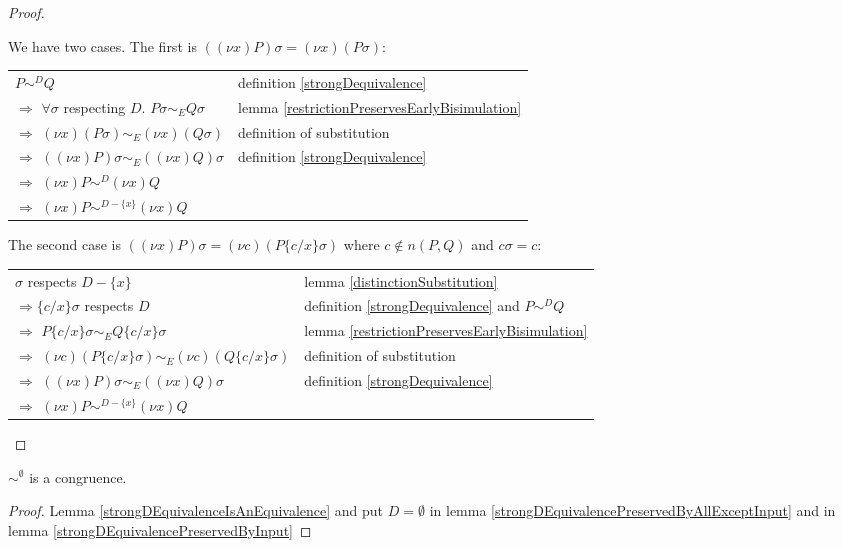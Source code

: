 \begin{lemma}
\begin{proof}
\begin{description}
	We have two cases. The first is $((\nu x) P)\sigma=(\nu x)(P\sigma)$:
	\begin{center}
	  \begin{tabular}{ll}
	      $P \sim^{D} Q$
	    &
	      definition \ref{strongDequivalence}
	  \\
	      $\Rightarrow$ $\forall \sigma$ respecting $D.$ $P\sigma \sim_{E} Q\sigma$
	    &
	      lemma \ref{restrictionPreservesEarlyBisimulation}
	  \\
	      $\Rightarrow$ $(\nu x)(P\sigma) \sim_{E} (\nu x)(Q\sigma)$
	    &
	      definition of substitution 
	  \\
	      $\Rightarrow$ $((\nu x)P)\sigma \sim_{E} ((\nu x)Q)\sigma$
	    &
	      definition \ref{strongDequivalence}
	  \\
	      $\Rightarrow$ $(\nu x)P \sim^{D} (\nu x)Q$
	    &
 	  \\
 	      $\Rightarrow$ $(\nu x)P \sim^{D-\{x\}} (\nu x)Q$
 	    &
	  \end{tabular}
	\end{center}		
	The second case is $((\nu x) P)\sigma=(\nu c)(P\{c/x\}\sigma)$ where $c\notin n(P,Q)$ and $c \sigma = c$:
	\begin{center}
	  \begin{tabular}{ll}
 	      $\sigma$ respects $D-\{x\}$
 	    &
 	      lemma \ref{distinctionSubstitution}
 	  \\
 	      $\Rightarrow \{c/x\}\sigma$ respects $D$
 	    &
 	      definition \ref{strongDequivalence} and $P \sim^{D} Q$
 	  \\
 	      $\Rightarrow$ $P\{c/x\}\sigma \sim_{E} Q\{c/x\}\sigma$
 	    &
 	      lemma \ref{restrictionPreservesEarlyBisimulation}
 	  \\
 	      $\Rightarrow$ $(\nu c)(P\{c/x\}\sigma) \sim_{E} (\nu c)(Q\{c/x\}\sigma)$
 	    &
 	      definition of substitution 
 	  \\
 	      $\Rightarrow$ $((\nu x)P)\sigma \sim_{E} ((\nu x)Q)\sigma$
 	    &
 	      definition \ref{strongDequivalence}
 	  \\
 	      $\Rightarrow$ $(\nu x)P \sim^{D-\{x\}} (\nu x)Q$
 	    &
 	  \end{tabular}
 	\end{center}		
    \end{description}
  \end{proof}
\end{lemma}



\begin{theorem}
  $\sim^{\emptyset}$ is a congruence.
  \begin{proof}
    Lemma \ref{strongDEquivalenceIsAnEquivalence} and put $D=\emptyset$ in lemma \ref{strongDEquivalencePreservedByAllExceptInput} and in lemma \ref{strongDEquivalencePreservedByInput}
  \end{proof}
\end{theorem}


